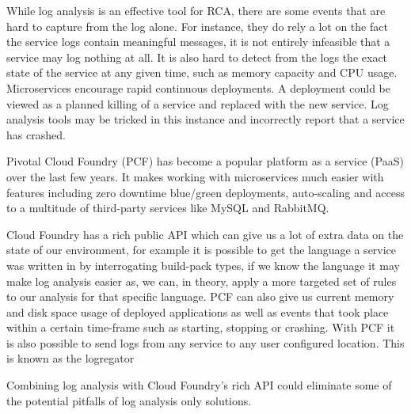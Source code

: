 While log analysis is an effective tool for RCA, there are some events that are hard to capture from the log alone. For instance, they do rely a lot on the fact the service logs contain meaningful messages, it is not entirely infeasible that a service may log nothing at all. It is also hard to detect from the logs the exact state of the service at any given time, such as memory capacity and CPU usage. Microservices encourage rapid continuous deployments\cite{villamizar2015evaluating}. A deployment could be viewed as a planned killing of a service and replaced with the new service. Log analysis tools may be tricked in this instance and incorrectly report that a service has crashed. 

Pivotal Cloud Foundry\cite{6924673} (PCF) has become a popular platform as a service (PaaS) over the last few years. It makes working with microservices much easier with features including zero downtime blue/green deployments, auto-scaling and access to a multitude of third-party services like MySQL and RabbitMQ.

Cloud Foundry has a rich public API which can give us a lot of extra data on the state of our environment, for example it is possible to get the language a service was written in by interrogating build-pack types, if we know the language it may make log analysis easier as, we can, in theory, apply a more targeted set of rules to our analysis for that specific language. PCF can also give us current memory and disk space usage of deployed applications as well as events that took place within a certain time-frame such as starting, stopping or crashing. With PCF it is also possible to send logs from any service to any user configured location. This is known as the logregator\cite{winn2017cloud}

Combining log analysis with Cloud Foundry's rich API could eliminate some of the potential pitfalls of log analysis only solutions. 